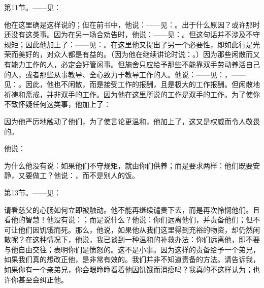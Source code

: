 第11节。——见：\par

他在这里确是这样说的；但在前书中，他说：——见：。出于什么原因？或许那时还没有这类事。因为在另一场合劝告时，他说：——见：。但这句话并不涉及不守规矩；因此他加上了：——见：。在这里他又提出了另一个必要性，即如此行是光荣而美好的，对众人都是有益的。（因为他在继续讲论时说：。）因为那些闲散而又有能力工作的人，必定会好管闲事。但施舍只应给予那些不能靠双手劳动养活自己的人，或者那些从事教导、全心致力于教导工作的人。他说：——见：，——见：。因此，他也不闲散，而是接受工作的报酬，且是极大的工作报酬。但闲散地祈祷和斋戒，并非双手的工作。因为他在这里所说的工作是双手的工作。为了使你不致怀疑任何这类事，他加上了：\par

\par

因为他严厉地触动了他们，为了使言论更温和，他加上了，这又是权威而令人敬畏的。\par

他说：\par

为什么他没有说：如果他们不守规矩，就由你们供养；而是要求两样：他们既要安静，又要做工？他说：，而不是别人的饭。\par

第13节。——见：\par

请看慈父的心肠如何立即被触动。他不能再继续谴责下去，而是再次怜悯他们。且看他的智慧！他没有说：；而是说什么？他说：你们远离他们，并责备他们；但不可让他们因饥饿而死。那么，他说，如果他从我们这里得到充裕的物资，却仍然闲散呢？在这种情况下，他说，我已谈到一种温和的补救办法：你们远离他，即不要与他自由交往；表明你们是愤怒的。这不是小事。因为这样的责备给予一个弟兄，如果我们真的想改正他，是非常有效的。我们并非不知道责备的方法。请告诉我，如果你有一个亲弟兄，你会眼睁睁看着他因饥饿而消瘦吗？我真的不这样认为；也许你甚至会纠正他。\par

